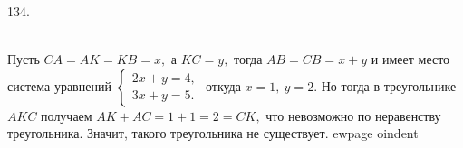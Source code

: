 134. \begin{figure}[ht!]
\end{figure}\\
Пусть $CA=AK=KB=x,$ а $KC=y,$ тогда $AB=CB=x+y$ и имеет место система уравнений $\begin{cases} 2x+y=4,\\ 3x+y=5.\end{cases}$ откуда $x=1,\ y=2.$ Но тогда в треугольнике $AKC$ получаем $AK+AC=1+1=2=CK,$ что невозможно по неравенству треугольника. Значит, такого треугольника не существует.
ewpage
oindent
